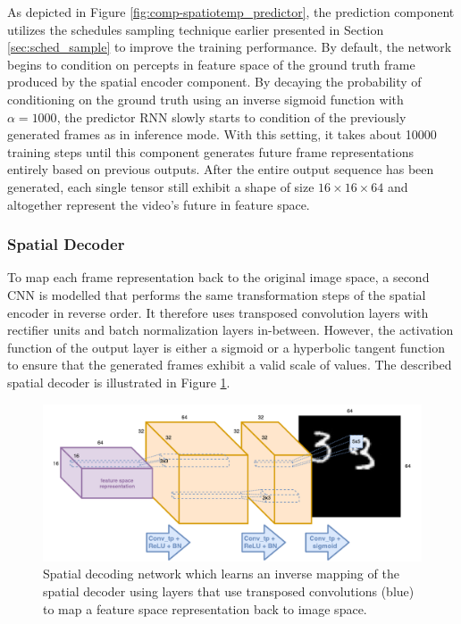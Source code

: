 As depicted in Figure \ref{fig:comp-spatiotemp_predictor}, the prediction component utilizes the schedules sampling technique earlier presented in Section \ref{sec:sched_sample} to improve the training performance. By default, the network begins to condition on percepts in feature space of the ground truth frame produced by the spatial encoder component. By decaying the probability of conditioning on the ground truth using an inverse sigmoid function with $\alpha = 1000$, the predictor RNN slowly starts to condition of the previously generated frames as in inference mode. With this setting, it takes about \num{10000} training steps until this component generates future frame representations entirely based on previous outputs. After the entire output sequence has been generated, each single tensor still exhibit a shape of size $16\times16\times64$ and altogether represent the video's future in feature space.

\subsubsection{Spatial Decoder}

To map each frame representation back to the original image space, a second CNN is modelled that performs the same transformation steps of the spatial encoder in reverse order. It therefore uses transposed convolution layers with rectifier units and batch normalization layers in-between. However, the activation function of the output layer is either a sigmoid or a hyperbolic tangent function to ensure that the generated frames exhibit a valid scale of values. The described spatial decoder is illustrated in Figure \ref{fig:comp-spatial_decoder}.

\begin{figure}[htb]
	\centering
	\includegraphics[width=0.9\linewidth]{figures/comp_spatial_decoder.pdf} 
	\caption[Spatial Decoder Component]{Spatial decoding network which learns an inverse mapping of the spatial decoder using layers that use transposed convolutions (blue) to map a feature space representation back to image space.} \label{fig:comp-spatial_decoder}
\end{figure}


